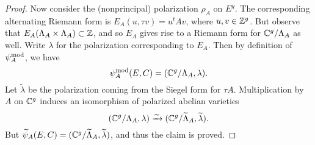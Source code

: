 \documentclass{amsart}
\begin{document}
\begin{proof}
Now consider the (nonprincipal) polarization $\rho_A$ on $E^g$. The corresponding alternating Riemann form is $E_A(u,\tau v) = u^tAv$, where $u,v \in \mathbb{Z}^g$. But observe that $E_A(\Lambda_A \times \Lambda_A) \subset \mathbb{Z}$, and so $E_A$ gives rise to a Riemann form for $\mathbb{C}^g/\Lambda_A$ as well. Write $\lambda$ for the polarization corresponding to $E_A$. Then by definition of $\psi_{A}^\mathrm{mod}$, we have
\[
  \psi_{A}^\mathrm{mod}(E,C) = (\mathbb{C}^g/\Lambda_A, \lambda).
\]
Let $\tilde{\lambda}$ be the polarization coming from the Siegel form for $\tau A$. Multiplication by $A$ on $\mathbb{C}^g$ induces an isomorphism of polarized abelian varieties
\[
  (\mathbb{C}^g/\Lambda_A, \lambda) \xrightarrow{\sim} (\mathbb{C}^g/\widetilde{\Lambda}_A, \widetilde{\lambda}).
\]
But $\widetilde{\psi}_{A}(E,C) = (\mathbb{C}^g/\widetilde{\Lambda}_A, \widetilde{\lambda})$, and thus the claim is proved.



\end{proof}
\end{document}
